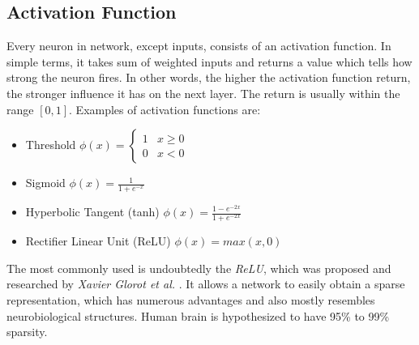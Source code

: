 \subsection{Activation Function}
\label{sub:activation-function}

Every neuron in network, except inputs, consists of an activation function. In simple terms, it takes sum of weighted inputs and returns a value which tells how strong the neuron fires. In other words, the higher the activation function return, the stronger influence it has on the next layer. The return is usually within the range $[0, 1]$. Examples of activation functions are: 
\begin{itemize}
    \item Threshold \hspace{5pt}
        $\phi(x) = 
        \begin{cases}
            1 & x \ge 0 \\
            0 & x<0
        \end{cases}$
    \item Sigmoid \hspace{5pt}
        $\phi(x) = \frac{1}{1+e^{-x}}$
    \item Hyperbolic Tangent (tanh) \hspace{5pt}
        $\phi(x) = \frac{1-e^{-2x}}{1+e^{-2x}}$
    \item Rectifier Linear Unit (ReLU) \hspace{5pt}
        $\phi(x) = max(x, 0)$
\end{itemize}

The most commonly used is undoubtedly the \emph{ReLU}, which was proposed and researched by \emph{Xavier Glorot et al.} \cite{DeepSparseReNN}. It allows a network to easily obtain a sparse representation, which has numerous advantages and also mostly resembles neurobiological structures. Human brain is hypothesized to have 95\% to 99\% sparsity.